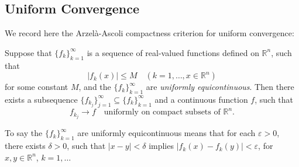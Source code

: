 \begin{figure}[h]\centering
\end{figure}

\subsection{Uniform Convergence}

We record here the Arzel\`a-Ascoli compactness criterion for uniform convergence:

\begin{theorem}
\label{thm:arzela-ascoli-theorem}
Suppose that $\{f_k\}_{k=1}^{\infty}$ is a sequence of real-valued functions defined on $\mathbb{R}^n$, such that
$$|f_k(x)| \leq M \quad (k = 1, \ldots, x \in \mathbb{R}^n)$$
for some constant $M$, and the $\{f_k\}_{k=1}^{\infty}$ are \textit{uniformly equicontinuous}. Then there exists a subsequence $\{f_{k_j}\}_{j=1}^{\infty} \subseteq \{f_k\}_{k=1}^{\infty}$ and a continuous function $f$, such that
$$f_{k_j} \to f \quad \text{uniformly on compact subsets of } \mathbb{R}^n.$$
\end{theorem}

\begin{definition}
\label{def:uniform-equicontinuity}
To say the $\{f_k\}_{k=1}^{\infty}$ are uniformly equicontinuous means that for each $\varepsilon > 0$, there exists $\delta > 0$, such that $|x - y| < \delta$ implies $|f_k(x) - f_k(y)| < \varepsilon$, for $x, y \in \mathbb{R}^n$, $k = 1, \ldots$
\end{definition}
